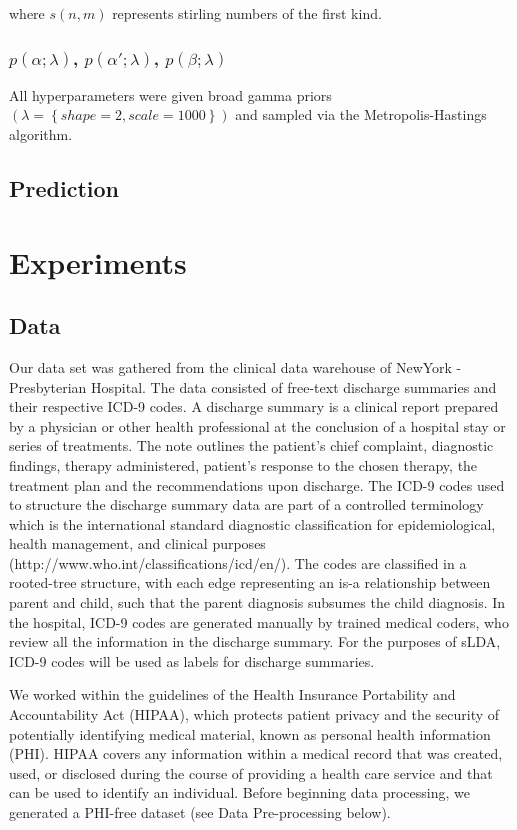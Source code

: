 \documentclass{article}
\begin{document}
where $s\left(n,m\right)$ represents stirling numbers of the first
kind.


\subsubsection{$p\left(\alpha;\lambda\right)$, $p\left(\alpha';\lambda\right)$,
$p\left(\beta;\lambda\right)$}

All hyperparameters were given broad gamma priors $\left(\lambda=\left\{ shape=2,scale=1000\right\} \right)$
and sampled via the Metropolis-Hastings algorithm.


\subsection{Prediction}


\section{Experiments}

\subsection{Data}

Our data set was gathered from the clinical data warehouse of NewYork
- Presbyterian Hospital. The data consisted of free-text discharge
summaries and their respective ICD-9 codes. A discharge summary is
a clinical report prepared by a physician or other health professional
at the conclusion of a hospital stay or series of treatments. The
note outlines the patient\textquoteright{}s chief complaint, diagnostic
findings, therapy administered, patient\textquoteright{}s response
to the chosen therapy, the treatment plan and the recommendations
upon discharge. The ICD-9 codes used to structure the discharge summary
data are part of a controlled terminology which is the international
standard diagnostic classification for epidemiological, health management,
and clinical purposes (http://www.who.int/classifications/icd/en/).
The codes are classified in a rooted-tree structure, with each edge
representing an is-a relationship between parent and child, such that
the parent diagnosis subsumes the child diagnosis. In the hospital,
ICD-9 codes are generated manually by trained medical coders, who
review all the information in the discharge summary. For the purposes
of sLDA, ICD-9 codes will be used as labels for discharge summaries.

We worked within the guidelines of the Health Insurance Portability
and Accountability Act (HIPAA), which protects patient privacy and
the security of potentially identifying medical material, known as
personal health information (PHI). HIPAA covers any information within
a medical record that was created, used, or disclosed during the course
of providing a health care service and that can be used to identify
an individual. Before beginning data processing, we generated a PHI-free
dataset (see Data Pre-processing below).
\end{document}
